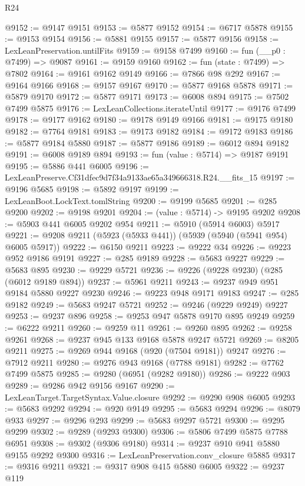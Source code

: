 \begin{lexlean}{R24}
\begin{coremodule}
@9152 := @9147 @9151
@9153 := @5877 @9152
@9154 := @6717 @5878
@9155 := @9153 @9154
@9156 := @5881 @9155
@9157 := @5877 @9156
@9158 := LexLeanPreservation.untilFits
@9159 := @9158 @7499
@9160 := fun (__p0 : @7499) => @9087
@9161 := @9159 @9160
@9162 := fun (state : @7499) => @7802
@9164 := @9161 @9162 @9149
@9166 := @7866 @98 @292
@9167 := @9164 @9166
@9168 := @9157 @9167
@9170 := @5877 @9168 @5878
@9171 := @5879 @9170
@9172 := @5877 @9171
@9173 := @6008 @894
@9175 := @7502 @7499 @5875
@9176 := LexLeanCollections.iterateUntil
@9177 := @9176 @7499
@9178 := @9177 @9162
@9180 := @9178 @9149 @9166
@9181 := @9175 @9180
@9182 := @7764 @9181
@9183 := @9173 @9182
@9184 := @9172 @9183
@9186 := @5877 @9184 @5880
@9187 := @5877 @9186
@9189 := @6012 @894 @9182
@9191 := @6008 @9189 @894
@9193 := fun (value : @5714) => @9187 @9191
@9195 := @5886 @441 @6005
@9196 := LexLeanPreserve.Cf31dfec9d7f34a9133ae65a349666318.R24.__fits_15
@9197 := @9196 @5685
@9198 := @5892 @9197
@9199 := LexLeanBoot.LockText.tomlString
@9200 := @9199 @5685
@9201 := @285 @9200
@9202 := @9198 @9201
@9204 := (value : @5714) -> @9195 @9202
@9208 := @5903 @441 @6005 @9202 @954
@9211 := @5910 (@5914 @6003) @5917
@9221 := @9208 @9211 (@5923 (@5933 @441)) (@5939 (@5940 (@5941 @954) @6005 @5917))
@9222 := @6150 @9211
@9223 := @9222 @34
@9226 := @9223 @952 @9186 @9191
@9227 := @285 @9189
@9228 := @5683 @9227
@9229 := @5683 @895
@9230 := @9229 @5721
@9236 := @9226 (@9228 @9230) (@285 (@6012 @9189 @894))
@9237 := @5961 @9211
@9243 := @9237 @949 @951 @9184 @5880 @9227 @9230
@9246 := @9223 @948 @9171 @9183
@9247 := @285 @9182
@9249 := @5683 @9247 @5721
@9252 := @9246 (@9229 @9249) @9227
@9253 := @9237 @896
@9258 := @9253 @947 @5878 @9170 @895 @9249
@9259 := @6222 @9211
@9260 := @9259 @11
@9261 := @9260 @895
@9262 := @9258 @9261
@9268 := @9237 @945 @133 @9168 @5878 @9247 @5721
@9269 := @8205 @9211
@9275 := @9269 @944 @9168 (@920 (@7504 @9181)) @9247
@9276 := @7912 @9211
@9280 := @9276 @943 @9168 (@7788 @9181)
@9282 := @7762 @7499 @5875
@9285 := @9280 (@6951 (@9282 @9180))
@9286 := @9222 @903
@9289 := @9286 @942 @9156 @9167
@9290 := LexLeanTarget.TargetSyntax.Value.closure
@9292 := @9290 @908 @6005
@9293 := @5683 @9292
@9294 := @920 @9149
@9295 := @5683 @9294
@9296 := @8079 @933
@9297 := @9296 @293
@9299 := @5683 @9297 @5721
@9300 := @9295 @9299
@9302 := @9289 (@9293 @9300)
@9306 := @5806 @7499 @5875 @7788 @6951
@9308 := @9302 (@9306 @9180)
@9314 := @9237 @910 @941 @5880 @9155 @9292 @9300
@9316 := LexLeanPreservation.conv_closure @5885
@9317 := @9316 @9211
@9321 := @9317 @908 @415 @5880 @6005
@9322 := @9237 @119

\end{coremodule}
\end{lexlean}
